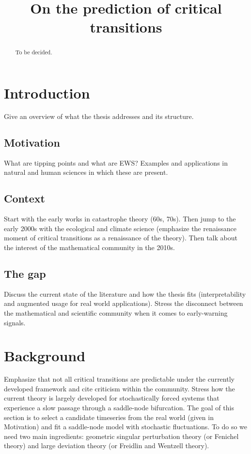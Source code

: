 \documentclass[11pt,a4paper]{article}
\title{On the prediction of critical transitions}
\author{}
\date{}
\theoremstyle{plain}
\theoremstyle{definition}
\theoremstyle{remark}
\begin{document}
\maketitle
\vspace{-1.1cm}

\begin{abstract}\noindent
  To be decided.
\end{abstract}

\section{Introduction}\label{sec:intro}
Give an overview of what the thesis addresses and its structure.

\subsection{Motivation}\label{subsec:motivation}
What are tipping points and what are EWS? 
Examples and applications in natural and human sciences in which these are present.

\subsection{Context}\label{subsec:context}
Start with the early works in catastrophe theory (60s, 70s).
Then jump to the early 2000s with the ecological and climate science (emphasize the renaissance moment of critical transitions as a renaissance of the theory).
Then talk about the interest of the mathematical community in the 2010s.

\subsection{The gap}\label{subsec:gap}
Discuss the current state of the literature and how the thesis fits (interpretability and augmented usage for real world applications).
Stress the disconnect between the mathematical and scientific community when it comes to early-warning signals.

\section{Background}\label{sec:background} 
Emphasize that not all critical transitions are predictable under the currently developed framework and cite criticism within the community.
Stress how the current theory is largely developed for stochastically forced systems that experience a slow passage through a saddle-node bifurcation.
The goal of this section is to select a candidate timeseries from the real world (given in Motivation) and fit a saddle-node model with stochastic fluctuations.
To do so we need two main ingredients: geometric singular perturbation theory (or Fenichel theory) and large deviation theory (or Freidlin and Wentzell theory).
\end{document}
